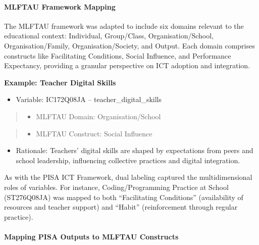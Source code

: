 \documentclass[
]{article}
\providecommand{\tightlist}{%
  \setlength{\itemsep}{0pt}\setlength{\parskip}{0pt}}
\begin{document}
\hypertarget{mlftau-framework-mapping}{%
\paragraph{MLFTAU Framework Mapping}\label{mlftau-framework-mapping}}

The MLFTAU framework was adapted to include six domains relevant to the
educational context: Individual, Group/Class, Organisation/School,
Organisation/Family, Organisation/Society, and Output. Each domain
comprises constructs like Facilitating Conditions, Social Influence, and
Performance Expectancy, providing a granular perspective on ICT adoption
and integration.

\textbf{Example: Teacher Digital Skills}

\begin{itemize}
\tightlist
\item
  Variable: IC172Q08JA -- teacher\_digital\_skills
\end{itemize}

\begin{quote}
\begin{itemize}
\tightlist
\item
  MLFTAU Domain: Organisation/School
\end{itemize}
\end{quote}

\begin{quote}
\begin{itemize}
\tightlist
\item
  MLFTAU Construct: Social Influence
\end{itemize}
\end{quote}

\begin{itemize}
\tightlist
\item
  Rationale: Teachers' digital skills are shaped by expectations from
  peers and school leadership, influencing collective practices and
  digital integration.
\end{itemize}

As with the PISA ICT Framework, dual labeling captured the
multidimensional roles of variables. For instance, Coding/Programming
Practice at School (ST276Q08JA) was mapped to both ``Facilitating
Conditions'' (availability of resources and teacher support) and
``Habit'' (reinforcement through regular practice).

\hypertarget{mapping-pisa-outputs-to-mlftau-constructs}{%
\paragraph{Mapping PISA Outputs to MLFTAU
Constructs}\label{mapping-pisa-outputs-to-mlftau-constructs}}
\end{document}
